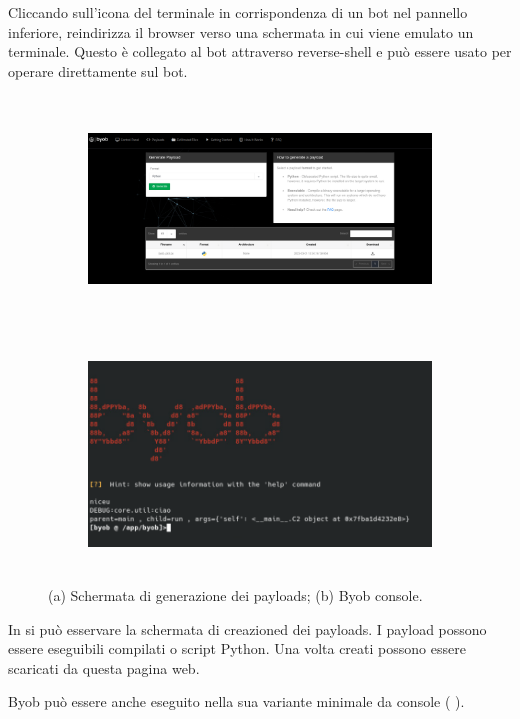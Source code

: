 Cliccando sull'icona del terminale in corrispondenza di un bot nel pannello inferiore, reindirizza il browser verso una schermata in cui viene emulato un terminale. Questo è collegato al bot attraverso reverse-shell e può essere usato per operare direttamente sul bot.
\begin{figure}[hbtp]
    \centering
    \begin{subfigure}{0.45\textwidth}
        \includegraphics[width=\textwidth , height=6cm]{res/fig/byob-payloads.png}
        \caption{}
        \label{fig:byobpayloads}
    \end{subfigure}
    \hfill
    \begin{subfigure}{0.45\textwidth}
        \centering
        \includegraphics[width=\textwidth , height=6cm]{res/fig/byob-console.png}
        \caption{}
        \label{fig:byobconsole}
    \end{subfigure}
    \caption{(a) Schermata di generazione dei payloads; (b) Byob console.}
    \label{ciao2}
\end{figure}

In  si può esservare la schermata di creazioned dei payloads. I payload possono essere eseguibili compilati o script Python. Una volta creati possono essere scaricati da questa pagina web.

Byob può essere anche eseguito nella sua variante minimale da console ( ).


